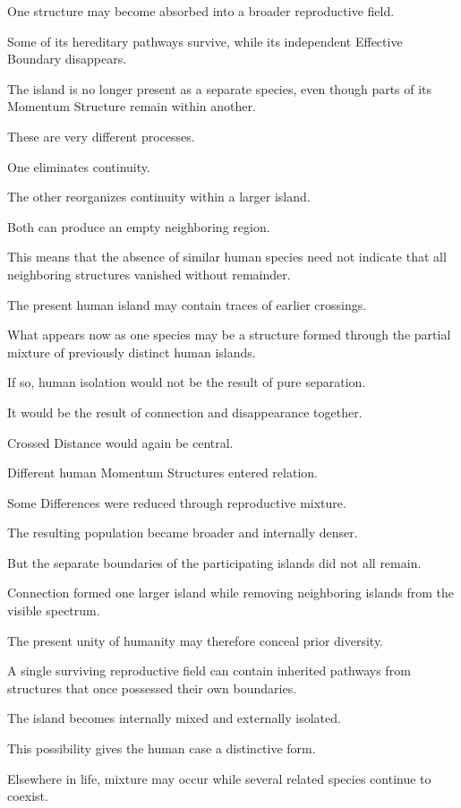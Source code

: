 One structure may become absorbed into a broader reproductive field.

Some of its hereditary pathways survive, while its independent Effective Boundary disappears.

The island is no longer present as a separate species, even though parts of its Momentum Structure remain within another.

These are very different processes.

One eliminates continuity.

The other reorganizes continuity within a larger island.

Both can produce an empty neighboring region.

This means that the absence of similar human species need not indicate that all neighboring structures vanished without remainder.

The present human island may contain traces of earlier crossings.

What appears now as one species may be a structure formed through the partial mixture of previously distinct human islands.

If so, human isolation would not be the result of pure separation.

It would be the result of connection and disappearance together.

Crossed Distance would again be central.

Different human Momentum Structures entered relation.

Some Differences were reduced through reproductive mixture.

The resulting population became broader and internally denser.

But the separate boundaries of the participating islands did not all remain.

Connection formed one larger island while removing neighboring islands from the visible spectrum.

The present unity of humanity may therefore conceal prior diversity.

A single surviving reproductive field can contain inherited pathways from structures that once possessed their own boundaries.

The island becomes internally mixed and externally isolated.

This possibility gives the human case a distinctive form.

Elsewhere in life, mixture may occur while several related species continue to coexist.

